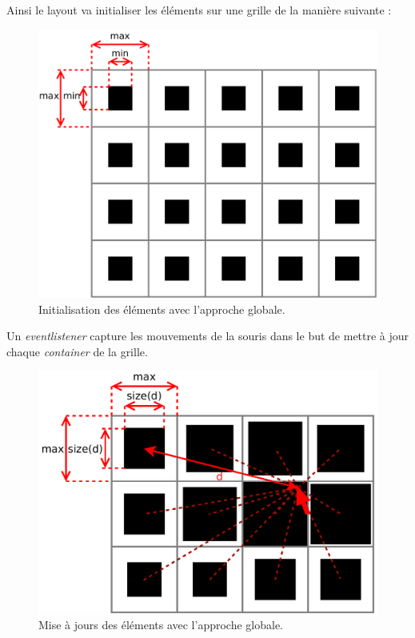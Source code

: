 Ainsi le layout va initialiser les éléments sur une grille de la manière suivante :
\begin{figure}[H]
  \centering
  \includegraphics[width=\textwidth]{../resources/illustrations/grob_app_init}
  \caption{Initialisation des éléments avec l'approche globale.}
\end{figure}

Un \emph{eventlistener} capture les mouvements de la souris dans le but de mettre à jour chaque \emph{container} de la grille.

\begin{figure}[H]
  \centering
  \includegraphics[width=\textwidth]{../resources/illustrations/grob_app_mouse}
  \caption{Mise à jours des éléments avec l'approche globale.}
\end{figure}

